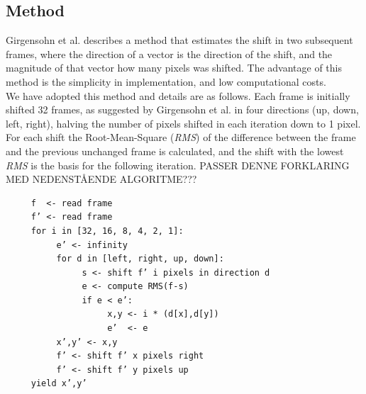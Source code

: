 \subsection{Method}
%
Girgensohn et al.\cite{Girgensohn:2000:SAH:354401.354415} describes a method that estimates the shift in two subsequent frames, where the direction of a vector is the direction of the shift, and the magnitude of that vector how many pixels was shifted. The advantage of this method is the simplicity in implementation, and low computational costs.\\
We have adopted this method and details are as follows. Each frame is initially shifted 32 frames, as suggested by Girgensohn et al. in four directions (up, down, left, right), halving the number of pixels shifted in each iteration down to 1 pixel.
For each shift the Root-Mean-Square (\textit{RMS}) of the difference between the frame and the previous unchanged frame is calculated, and the shift with the lowest \textit{RMS} is the basis for the following iteration. %
PASSER DENNE FORKLARING MED NEDENSTÅENDE ALGORITME???
%
\begin{verbatim}
     f  <- read frame
     f’ <- read frame
     for i in [32, 16, 8, 4, 2, 1]:
          e’ <- infinity
          for d in [left, right, up, down]:
               s <- shift f’ i pixels in direction d
               e <- compute RMS(f-s)
               if e < e’:
                    x,y <- i * (d[x],d[y])
                    e’  <- e
          x’,y’ <- x,y
          f’ <- shift f’ x pixels right
          f’ <- shift f’ y pixels up
     yield x’,y’
\end{verbatim}
